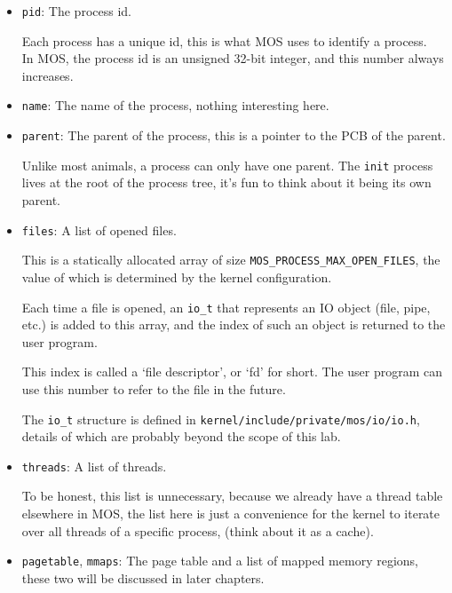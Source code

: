 \begin{itemize}
    \item \texttt{pid}: The process id.

          Each process has a unique id, this is what MOS uses to identify a process.\\
          In MOS, the process id is an unsigned 32-bit integer, and this number always
          increases.

    \item \texttt{name}: The name of the process, nothing interesting here.

    \item \texttt{parent}: The parent of the process, this is a pointer to the PCB of the parent.

          Unlike most animals, a process can only have one parent. The \texttt{init}
          process lives at the root of the process tree, it's fun to think about it being its own
          parent.

    \item \texttt{files}: A list of opened files.

          This is a statically allocated array of size \texttt{MOS\_PROCESS\_MAX\_OPEN\_FILES},
          the value of which is determined by the kernel configuration.

          Each time a file is opened, an \texttt{io\_t} that represents an IO object (file, pipe, etc.)
          is added to this array, and the index of such an object is returned to the user program.

          This index is called a `file descriptor', or `fd' for short. The user program can use
          this number to refer to the file in the future.

          The \texttt{io\_t} structure is defined in \texttt{kernel/include/private/mos/io/io.h},
          details of which are probably beyond the scope of this lab.

    \item \texttt{threads}: A list of threads.

          To be honest, this list is unnecessary, because we already have a thread table elsewhere
          in MOS, the list here is just a convenience for the kernel to iterate over all threads
          of a specific process, (think about it as a cache).

    \item \texttt{pagetable}, \texttt{mmaps}: The page table and a list of mapped memory regions,
          these two will be discussed in later chapters.
\end{itemize}

